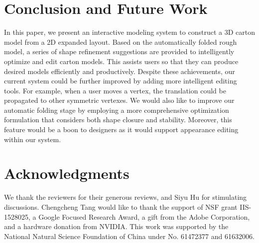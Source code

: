 \documentclass{gmp2018}
\begin{document}









\section{Conclusion and Future Work}\label{sec:conclusion}
In this paper, we present an interactive modeling system to construct a 3D carton model from a 2D expanded layout. 
Based on the automatically folded rough model, a series of shape refinement suggestions are provided to intelligently optimize and edit carton models. This assists users so that they can produce desired models efficiently and productively.  
%
Despite these achievements, our current system could be further improved by adding more intelligent editing tools. For example, when a user moves a vertex, the translation could be propagated to other symmetric vertexes.
We would also like to improve our automatic folding stage by employing a more comprehensive optimization formulation that considers both shape closure and stability. 
%
Moreover, this feature would be a boon to designers as it would support appearance editing within our system. 
%

\section*{Acknowledgments} We thank the reviewers for their generous reviews, and Siyu Hu for stimulating discussions. Chengcheng Tang would like to thank the support of NSF grant IIS-1528025, a Google Focused Research Award, a gift from the Adobe Corporation, and a hardware donation from NVIDIA. This work was supported by the National Natural Science Foundation of China under No. 61472377 and 61632006.



\end{document}
